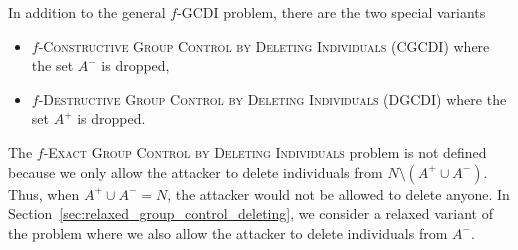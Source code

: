 \documentclass[
    12pt,               %
    a4paper,            %
    bibtotoc,           %
    pointlessnumbers,   %
    ngerman,            %
    titlepage,          %
    leqno,              %
    ]{scrarticle}       %
\newcommand\secref{Section~\ref}
\begin{document}
In addition to the general $f$-GCDI problem, there are the two special variants
\begin{itemize}
\item
$f$-\textsc{Constructive Group Control by Deleting Individuals} (CGCDI) where the set $A^-$ is dropped,
\item
$f$-\textsc{Destructive Group Control by Deleting Individuals} (DGCDI) where the set $A^+$ is dropped.
\end{itemize}

The $f$-\textsc{Exact Group Control by Deleting Individuals} problem is not defined because we only allow the attacker to delete individuals from $N \setminus (A^+ \cup A^-)$. Thus, when $A^+ \cup A^- = N$, the attacker would not be allowed to delete anyone. In \secref{sec:relaxed_group_control_deleting}, we consider a relaxed variant of the problem where we also allow the attacker to delete individuals from $A^-$.







\end{document}
